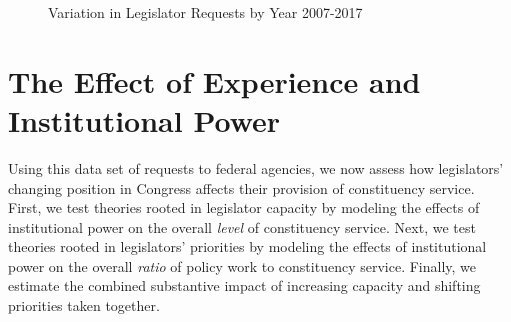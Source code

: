 \documentclass[12pt]{article}
\begin{document}
\begin{figure}
\centering
\caption{Variation in Legislator Requests by Year 2007-2017} \label{f:peryear} 
\begin{minipage}{\textwidth}
\end{minipage}
\end{figure}






\section{The Effect of Experience and Institutional Power}\label{s:results} 

Using this data set of requests to federal agencies, we now assess how legislators' changing position in Congress affects their provision of constituency service. First, we test theories rooted in legislator capacity by modeling the effects of institutional power on the overall \textit{level} of constituency service. Next, we test theories rooted in legislators' priorities by modeling the effects of institutional power on the overall \textit{ratio} of policy work to constituency service. Finally, we estimate the combined substantive impact of increasing capacity and shifting priorities taken together. 
\end{document}
